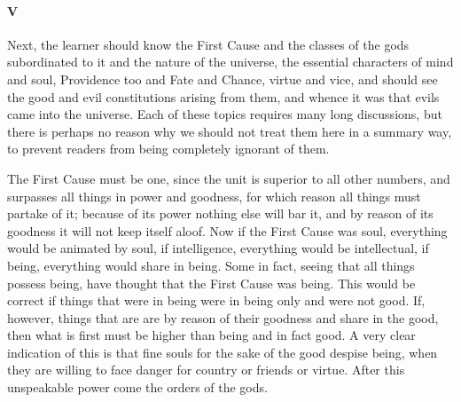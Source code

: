 \documentclass[12pt]{article}
\begin{document}
\paragraph{V} Next, the learner should know the First Cause and the classes of
the gods subordinated to it and the nature of the universe, the essential
characters of mind and soul, Providence too and Fate and Chance, virtue and
vice, and should see the good and evil constitutions arising from them, and
whence it was that evils came into the universe. Each of these topics requires
many long discussions, but there is perhaps no reason why we should not treat
them here in a summary way, to prevent readers from being completely ignorant
of them.

The First Cause must be one, since the unit is superior to all other numbers,
and surpasses all things in power and goodness, for which reason all things
must partake of it; because of its power nothing else will bar it, and by
reason of its goodness it will not keep itself aloof. Now if the First Cause
was soul, everything would be animated by soul, if intelligence, everything
would be intellectual, if being, everything would share in being. Some in fact,
seeing that all things possess being, have thought that the First Cause was
being. This would be correct if things that were in being were in being only
and were not good. If, however, things that are are by reason of their goodness
and share in the good, then what is first must be higher than being and in fact
good. A very clear indication of this is that fine souls for the sake of the
good despise being, when they are willing to face danger for country or friends
or virtue. After this unspeakable power come the orders of the gods.
\end{document}
